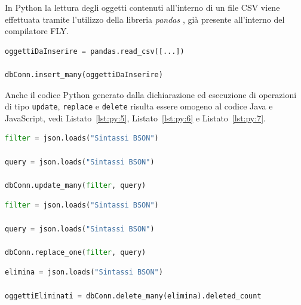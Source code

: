 In Python la lettura degli oggetti contenuti all'interno di un file CSV viene effettuata tramite l'utilizzo della libreria \textit{pandas} \cite{pandas}, già presente all'interno del compilatore FLY.
\begin{lstlisting}[language=Python,caption={Codice Python generato per la variabile di tipo query per l’esecuzione di un’interrogazione di inserimento che utilizza una variabile di tipo file.}, label={lst:py:4}]
oggettiDaInserire = pandas.read_csv([...])

dbConn.insert_many(oggettiDaInserire)
\end{lstlisting}
Anche il codice Python generato dalla dichiarazione ed esecuzione di operazioni di tipo \verb|update|, \verb|replace| e \verb|delete| risulta essere omogeno al codice Java e JavaScript, vedi Listato~\ref{lst:py:5}, Listato~\ref{lst:py:6} e Listato~\ref{lst:py:7}.
\begin{lstlisting}[language=Python,caption={Codice Python generato per la variaibile di tipo query per l’esecuzione di un’interrogazione di update.}, label={lst:py:5}]
filter = json.loads("Sintassi BSON")

query = json.loads("Sintassi BSON")

dbConn.update_many(filter, query)
\end{lstlisting}
\begin{lstlisting}[language=Python,caption={Codice Python generato per la variaibile di tipo query per l’esecuzione di un’interrogazione di replace.}, label={lst:py:6}]
filter = json.loads("Sintassi BSON")

query = json.loads("Sintassi BSON")

dbConn.replace_one(filter, query)
\end{lstlisting}
\begin{lstlisting}[language=Python,caption={Codice Python generato per la variaibile di tipo query per l’esecuzione di un’interrogazione di delete.}, label={lst:py:7}]
elimina = json.loads("Sintassi BSON")

oggettiEliminati = dbConn.delete_many(elimina).deleted_count
\end{lstlisting}

